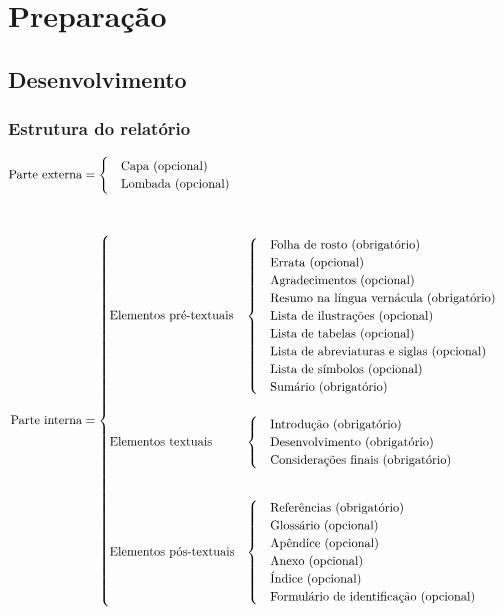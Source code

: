 \documentclass{Arquivos/TrabalhoAcademico}
\begin{document}
\Sumario


\textual %




\part{Preparação} %
\chapter{Desenvolvimento}
\section{Estrutura do relatório}

{\SingleSpacing
\[
\begin{aligned}
\text{Parte externa} &=
\begin{cases}
\quad\text{Capa (opcional)}\\
\quad\text{Lombada (opcional)}
\end{cases}
\\[3em]
\text{Parte interna} &=
\begin{cases}
\text{Elementos pré-textuais} &
\begin{cases}
\quad\text{Folha de rosto (obrigatório)}\\
\quad\text{Errata (opcional)}\\
\quad\text{Agradecimentos (opcional)}\\
\quad\text{Resumo na língua vernácula (obrigatório)}\\
\quad\text{Lista de ilustrações (opcional)}\\
\quad\text{Lista de tabelas (opcional)}\\
\quad\text{Lista de abreviaturas e siglas (opcional)}\\
\quad\text{Lista de símbolos (opcional)}\\
\quad\text{Sumário (obrigatório)}
\end{cases}
\\\rule{0pt}{4em}
\text{Elementos textuais} &
\begin{cases}
\quad\text{Introdução (obrigatório)}\\
\quad\text{Desenvolvimento (obrigatório)}\\
\quad\text{Considerações finais (obrigatório)}
\end{cases}
\\\rule{0pt}{7em}
\text{Elementos pós-textuais} &
\begin{cases}
\quad\text{Referências (obrigatório)}\\
\quad\text{Glossário (opcional)}\\
\quad\text{Apêndice (opcional)}\\
\quad\text{Anexo (opcional)}\\
\quad\text{Índice (opcional)}\\
\quad\text{Formulário de identificação (opcional)}
\end{cases}
\end{cases}
\end{aligned}
\]}
\end{document}
